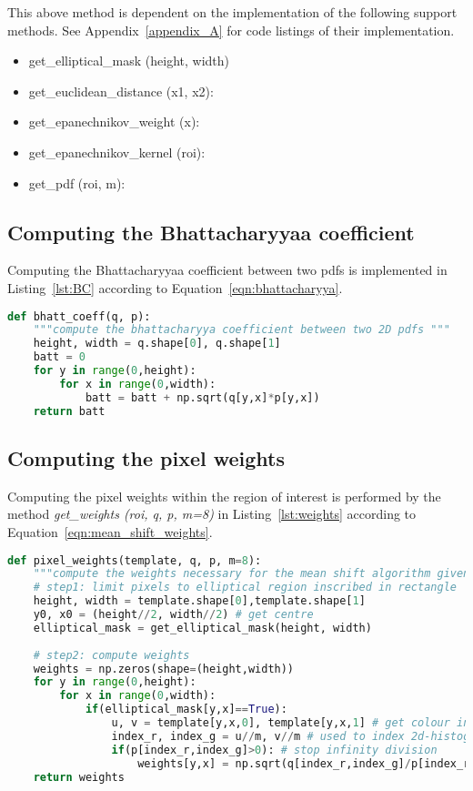 This above method is dependent on the implementation of the following support
methods. See Appendix~\ref{appendix_A} for code listings of their implementation.
\begin{itemize}
    \item get\_elliptical\_mask (height, width)
    \item get\_euclidean\_distance (x1, x2):
    \item get\_epanechnikov\_weight (x):
    \item get\_epanechnikov\_kernel (roi):
    \item get\_pdf (roi, m):
\end{itemize}

\subsection{Computing the Bhattacharyyaa coefficient}
Computing the Bhattacharyyaa coefficient between two pdfs is implemented in
Listing~\ref{lst:BC} according to Equation~\ref{eqn:bhattacharyya}. 

\begin{lstlisting}[language=Python, caption={Function computing the Bhattacharyya coefficient}, captionpos=b, label={lst:BC}]
def bhatt_coeff(q, p):
    """compute the bhattacharyya coefficient between two 2D pdfs """
    height, width = q.shape[0], q.shape[1]
    batt = 0
    for y in range(0,height):
        for x in range(0,width):
            batt = batt + np.sqrt(q[y,x]*p[y,x])
    return batt
\end{lstlisting}

\subsection{Computing the pixel weights}
Computing the pixel weights within the region of interest is performed by the
method \textit{get\_weights (roi, q, p, m=8)} in Listing~\ref{lst:weights} according to Equation~\ref{eqn:mean_shift_weights}.

\begin{lstlisting}[language=Python, caption={Function computing kernel Weights}, captionpos=b, label={lst:weights}]
def pixel_weights(template, q, p, m=8):
    """compute the weights necessary for the mean shift algorithm given q and p"""
    # step1: limit pixels to elliptical region inscribed in rectangle
    height, width = template.shape[0],template.shape[1]
    y0, x0 = (height//2, width//2) # get centre 
    elliptical_mask = get_elliptical_mask(height, width)
    
    # step2: compute weights
    weights = np.zeros(shape=(height,width))
    for y in range(0,height):
        for x in range(0,width): 
            if(elliptical_mask[y,x]==True):  
                u, v = template[y,x,0], template[y,x,1] # get colour index, u 
                index_r, index_g = u//m, v//m # used to index 2d-histogram
                if(p[index_r,index_g]>0): # stop infinity division
                    weights[y,x] = np.sqrt(q[index_r,index_g]/p[index_r,index_g]) # comp weight
    return weights 
\end{lstlisting}

